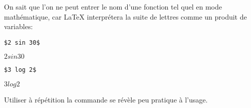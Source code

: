 On sait que l'on ne peut entrer le nom d'une fonction tel quel en mode
mathématique, car {\LaTeX} interprétera la suite de lettres comme un
produit de variables:
\begin{demo}
\item
  \begin{texinput}{0.25\linewidth}
\begin{lstlisting}
$2 sin 30$
\end{lstlisting}
  \end{texinput}
  \quad
  \begin{texoutput}{0.2\linewidth}
    $2 sin 30$
  \end{texoutput}
  \hfill
  \begin{texinput}{0.25\linewidth}
\begin{lstlisting}
$3 log 2$
\end{lstlisting}
  \end{texinput}
  \quad
  \begin{texoutput}{0.2\linewidth}
    $3 log 2$
  \end{texoutput}
\end{demo}
Utiliser à répétition la commande  se révèle peu
pratique à l'usage.

